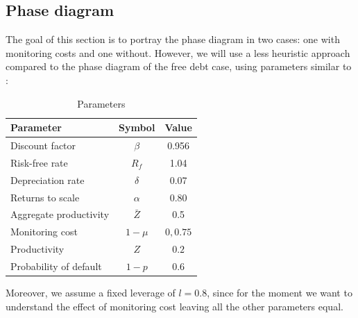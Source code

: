 \documentclass[12pt]{report}
\begin{document}
\subsection{Phase diagram}
The goal of this section is to portray the phase diagram in two cases: one with monitoring costs and one without.
However, we will use a less heuristic approach compared to the phase diagram of the free debt case, using  parameters similar to \cite{OsePap17}:
\begin{table}[H]
    \centering
    \begin{tabular}{lcc}
    \hline Parameter & Symbol & Value \\
    \hline \hline
    Discount factor & $\beta$ & 0.956 \\
    Risk-free rate & $R_f$ & 1.04 \\
    Depreciation rate & $\delta$ & 0.07 \\
    Returns to scale & $\alpha$ & 0.80 \\
    Aggregate productivity & $\bar{Z}$ & 0.5 \\
    Monitoring cost & $1-\mu$ & ${0,0.75}$ \\
    Productivity &$Z$&$0.2$\\
    Probability of default & $1-p $&0.6 \\
    \hline
    \end{tabular}
    \caption{Parameters}
\end{table}
Moreover, we assume a fixed leverage of \(l=0.8\), since for the moment we want to understand the effect of monitoring
cost leaving all the other parameters equal.
\end{document}
